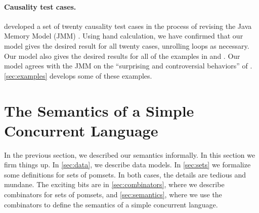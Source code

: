 \paragraph{Causality test cases.} 
\citet{PughWebsite} developed a set of twenty {causality test cases} in the
process of revising the Java Memory Model (JMM)
\cite{Manson:2005:JMM:1047659.1040336}.  Using hand calculation, we have
confirmed that our model gives the desired result for all twenty cases,
unrolling loops as necessary.
Our model also gives the desired results for
all of the examples in \citet[]{DBLP:conf/esop/BattyMNPS15} and
\citet[]{SevcikThesis}.  Our model agrees with the JMM on the
``surprising and controversial behaviors'' of \citet[]{Manson:2005:JMM:1047659.1040336}. \textsection\ref{sec:examples} develops some of these examples.


\section{The Semantics of a Simple Concurrent Language}
\label{sec:model}

In the previous section, we described our semantics informally.  In this
section we firm things up.  In \textsection\ref{sec:data}, we describe data
models.  In \textsection\ref{sec:sets} we formalize some definitions for sets
of pomsets.  In both cases, the details are tedious and mundane.  The
exciting bits are in \textsection\ref{sec:combinators}, where we describe
combinators for sets of pomsets, and \textsection\ref{sec:semantics}, where
we use the combinators to define the semantics of a simple concurrent
language.
 
